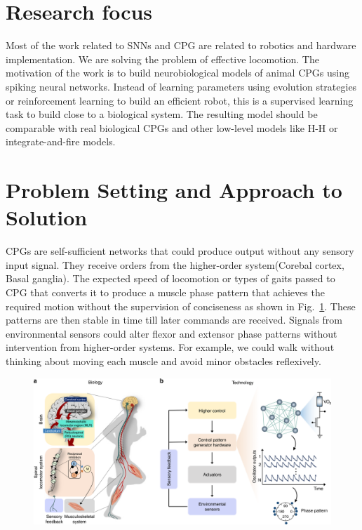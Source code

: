 \section{Research focus}
Most of the work related to SNNs and CPG are related to robotics and hardware implementation. We are solving the problem of effective locomotion. The motivation of the work is to build neurobiological models of animal CPGs using spiking neural networks. Instead of learning parameters using evolution strategies or reinforcement learning to build an efficient robot, this is a supervised learning task to build close to a biological system. The resulting model should be comparable with real biological CPGs and other low-level models like H-H or integrate-and-fire models. 

\section{Problem Setting and Approach to Solution}
CPGs are self-sufficient networks that could produce output without any sensory input signal. They receive orders from the higher-order system(Corebal cortex, Basal ganglia). The expected speed of locomotion or types of gaits passed to CPG that converts it to produce a muscle phase pattern that achieves the required motion without the supervision of conciseness as shown in Fig.~\ref{fig2}. These patterns are then stable in time till later commands are received. Signals from environmental sensors could alter flexor and extensor phase patterns without intervention from higher-order systems. For example, we could walk without thinking about moving each muscle and avoid minor obstacles reflexively.

\begin{figure}
\includegraphics[width=\textwidth]{images/cpg_img.png}

 \label{fig2}

\end{figure}

